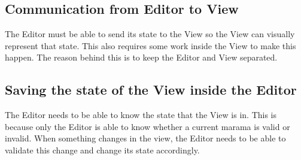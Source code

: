 \documentclass[10pt]{extarticle} %
\begin{document}
    \subsection{Communication from Editor to View}
    The Editor must be able to send its state to the View so the View can visually represent that state.
    This also requires some work inside the View to make this happen.
    The reason behind this is to keep the Editor and View separated.
    \subsection{Saving the state of the View inside the Editor}
    The Editor needs to be able to know the state that the View is in.
    This is because only the Editor is able to know whether a current marama is valid or invalid.
    When something changes in the view, the Editor needs to be able to validate this change and change its state accordingly.

    \newpage
    
    
\end{document}
